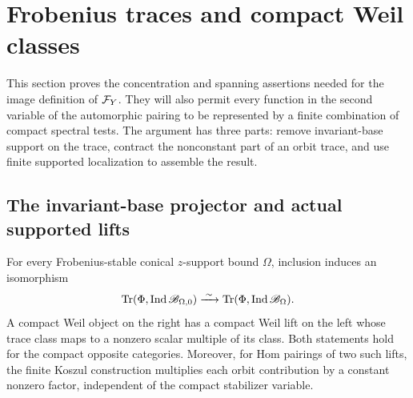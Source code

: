 \section{Frobenius traces and compact Weil classes}\label{tr:section}

This section proves the concentration and spanning assertions needed
for the image definition of $\mathcal F_Y$.  They will also permit every
function in the second variable of the automorphic pairing to be
represented by a finite combination of compact spectral tests.
The argument has three parts: remove invariant-base support on the
trace, contract the nonconstant part of an orbit trace, and use finite
supported localization to assemble the result.

\subsection{The invariant-base projector and actual supported lifts}

\begin{lemma}\label{tr:invariant-support}
For every Frobenius-stable conical $z$-support bound $\Omega$, inclusion
induces an isomorphism
\begin{equation}\label{tr:remove-completion}
 \operatorname{Tr}(\Phi,\operatorname{Ind}\mathscr B_{\Omega,0})
       \xrightarrow{\;\sim\;}
 \operatorname{Tr}(\Phi,\operatorname{Ind}\mathscr B_\Omega).
\end{equation}
A compact Weil object on the right has a compact Weil lift on the left
whose trace class maps to a nonzero scalar multiple of its class.
Both statements hold for the compact opposite categories.
Moreover, for Hom pairings of two such lifts, the finite Koszul
construction multiplies each orbit contribution by a constant nonzero
factor, independent of the compact stabilizer variable.
\end{lemma}

